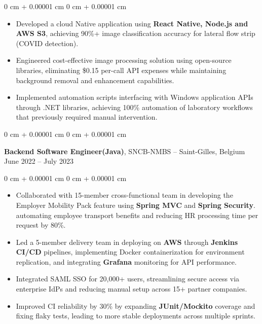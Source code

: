 \documentclass[10pt, letterpaper]{article}
\newenvironment{highlights}{
    \begin{itemize}[
        topsep=0.10 cm,
        parsep=0.10 cm,
        partopsep=0pt,
        itemsep=0pt,
        leftmargin=0 cm + 10pt
    ]
}{
    \end{itemize}
} %
\newenvironment{onecolentry}{
    \begin{adjustwidth}{
        0 cm + 0.00001 cm
    }{
        0 cm + 0.00001 cm
    }
}{
    \end{adjustwidth}
} %
\newenvironment{twocolentry}[2][]{
    \onecolentry
    \def\secondColumn{#2}
    \setcolumnwidth{\fill, 4.5 cm}
    \begin{paracol}{2}
}{
    \switchcolumn \raggedleft \secondColumn
    \end{paracol}
    \endonecolentry
} %
\begin{document}
        \vspace{0.10 cm}
        \begin{onecolentry}
            \begin{highlights}
                \item Developed a cloud Native application using \textbf{React Native, Node.js and  AWS S3}, achieving 90\%+ image classification accuracy for lateral flow strip (COVID detection).

                \item Engineered cost-effective image processing solution using open-source libraries, eliminating \$0.15 per-call API
expenses while maintaining background removal and enhancement capabilities.
         
                \item Implemented automation scripts interfacing with Windows application APIs through .NET libraries, achieving 100\% automation of laboratory workflows that previously required manual intervention.
            \end{highlights}
        \end{onecolentry}
        
        \vspace{0.1 cm}

        \begin{twocolentry}{
            June 2022 – July 2023
        }
            \textbf{Backend Software Engineer(Java)}, SNCB-NMBS -- Saint-Gilles, Belgium \end{twocolentry}

        \vspace{0.1 cm}
        \begin{onecolentry}
            \begin{highlights}
                \item Collaborated with 15-member cross-functional team in developing the Employer Mobility Pack feature using \textbf{Spring MVC} and \textbf{Spring Security}. automating employee transport benefits and reducing HR processing time per request by 80\%.
                \item Led a 5-member delivery team in deploying on \textbf{AWS} through \textbf{Jenkins CI/CD} pipelines, implementing Docker containerization for environment replication, and integrating \textbf{Grafana} monitoring for API performance.
                        
                 \item Integrated SAML SSO for 20,000+ users, streamlining secure access via enterprise IdPs and reducing manual setup across 15+ partner companies.
                \item Improved CI reliability by 30\% by expanding \textbf{JUnit/Mockito} coverage and fixing flaky tests, leading to more stable deployments across multiple sprints.
            \end{highlights}
        \end{onecolentry}
        
\end{document}

